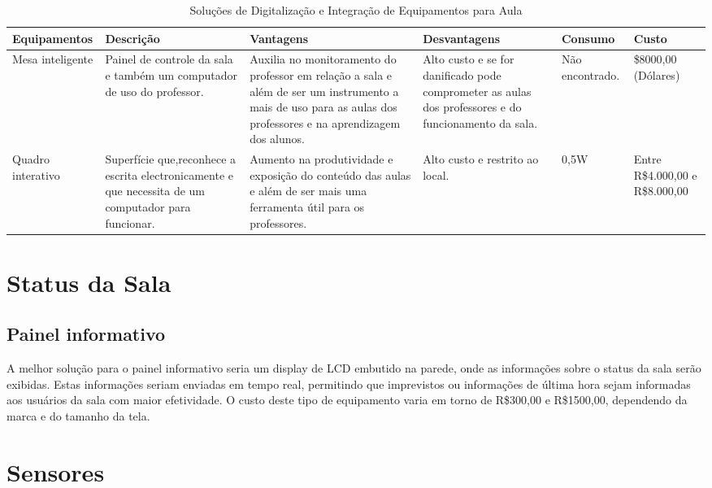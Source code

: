 \begin{table}[!ht]
  \centering
  \caption{Soluções de Digitalização e Integração de Equipamentos para Aula}
  \label{my-label}
  \begin{tabular}{|l|l|l|l|l|l|}
    \hline
    \textbf{Equipamentos} & \textbf{Descrição} & \textbf{Vantagens} & \textbf{Desvantagens} & \textbf{Consumo} & \textbf{Custo} \\ \hline
    \parbox[t]{3cm}{Mesa inteligente} & \parbox[t]{2cm}{Painel de controle da sala e também um computador de uso do professor}. & \parbox[t]{3cm}{Auxilia no monitoramento do professor em relação a sala e além de ser um instrumento a mais de uso para as aulas dos professores e na aprendizagem dos alunos.} & \parbox[t]{3cm}{Alto custo e se for danificado pode comprometer as aulas dos professores e do funcionamento da sala.} & \parbox[t]{2cm}{Não encontrado.} & \parbox[t]{2cm}{\$8000,00 (Dólares)} \\ \hline
    \parbox[t]{3cm}{Quadro interativo} & \parbox[t]{2cm}{Superfície que,reconhece a escrita electronicamente e que necessita de um computador para funcionar.} & \parbox[t]{3cm}{Aumento na produtividade e exposição do conteúdo das aulas e além de ser mais uma ferramenta útil para os professores.} & \parbox[t]{3cm}{Alto custo e restrito ao local.} & \parbox[t]{2cm}{0,5W} & \parbox[t]{2cm}{Entre R\$4.000,00 e R\$8.000,00} \\ \hline
  \end{tabular}
\end{table}

\section{Status da Sala}

\subsection{Painel informativo}

A melhor solução para o painel informativo seria um display de LCD embutido na parede, onde as informações sobre o status da sala serão exibidas. Estas informações seriam enviadas em tempo real, permitindo que imprevistos ou informações de última hora sejam informadas aos usuários da sala com maior efetividade. O custo deste tipo de equipamento varia em torno de R\$300,00 e R\$1500,00, dependendo da marca e do tamanho da tela.

\section{Sensores}

